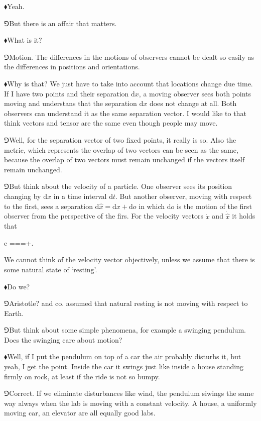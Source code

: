 \documentclass[10pt,oneside%
]{memoir}
\newenvironment{eqna}{\begin{IEEEeqnarray*}{c}}{\end{IEEEeqnarray*}\ignorespacesafterend}
\newcommand{\der}[2]{\frac{\dd#1}{\dd#2}}
\newcommand{\dd}{\mathrm{d}}
\newcommand{\primed}[1]{\hat{#1}}
\newcommand{\hea}{\(\blacklozenge\)\;}
\newcommand{\heb}{\(\Game\)\;}
\begin{document}
\hea Yeah.

\heb But there is an affair that matters.

\hea What is it?

\heb Motion. The differences in the motions of observers cannot be dealt so easily as the differences in positions and orientations.

\hea Why is that? We just have to take into account that locations change due time. If I have two points and their separation \(\dd x\), a moving observer sees both points moving and understans that the separation \(\dd x\) does not change at all. Both observers can understand it as the same separation vector. I would like to that think vectors and tensor are the same even though people may move.

\heb Well, for the separation vector of two fixed points, it really is so. Also the metric, which represents the overlap of two vectors can be seen as the same, because the overlap of two vectors must remain unchanged if the vectors itself remain unchanged.

\heb But think about the velocity of a particle. One observer sees its position changing by \(\dd x\) in a time interval \(\dd t\). But another observer, moving with respect to the first, sees a separation \(\dd\primed{x}=\dd x+\dd o\) in which \(\dd o\) is the motion of the first observer from the perspective of the firs. For the velocity vectors \(\dot{x}\) and \(\dot{\primed{x}}\) it holds that
\begin{eqna}
    \dot{\primed{x}}=\der{\primed{x}}{t}=\der{x+\dd o}{t}=+.
\end{eqna}
We cannot think of the velocity vector objectively, unless we assume that there is some natural state of `resting'.

\hea Do we?

\heb Aristotle? and co. assumed that natural resting is not moving with respect to Earth.

\heb But think about some simple phenomena, for example a swinging pendulum. Does the swinging care about motion?

\hea Well, if I put the pendulum on top of a car the air probably disturbs it, but yeah, I get the point. Inside the car it swings just like inside a house standing firmly on rock, at least if the ride is not so bumpy.

\heb Correct. If we eliminate disturbances like wind, the pendulum siwings the same way always when the lab is moving with a constant velocity. A house, a uniformly moving car, an elevator are all equally good labs.
\end{document}
